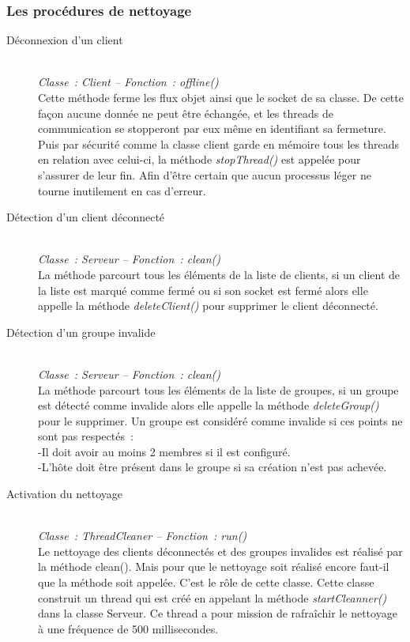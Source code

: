\documentclass[a4paper,11pt]{report}
\begin{document}
\subsubsection{Les procédures de nettoyage}
\begin{description}
  \item[Déconnexion d’un client]
  \textit{\\Classe : Client – Fonction : offline()\\}
Cette méthode ferme les flux objet ainsi que le socket de sa classe. De cette façon aucune donnée ne peut être échangée, et les threads de communication se stopperont par eux même en identifiant sa fermeture.
Puis par sécurité comme la classe client garde en mémoire tous les threads en relation avec celui-ci, la méthode \textit{stopThread()} est appelée pour s’assurer de leur fin. Afin d’être certain que aucun processus léger ne tourne inutilement en cas d’erreur.
  
  \item[Détection d’un client déconnecté]
  \textit{\\Classe : Serveur – Fonction : clean()\\}
  La méthode parcourt tous les éléments de la liste de clients, si un client de la liste est marqué comme fermé ou si son socket est fermé alors elle appelle la méthode \textit{deleteClient()} pour supprimer le client déconnecté.
  
  \item[Détection d’un groupe invalide]
  \textit{\\Classe : Serveur – Fonction : clean()\\}
  La méthode parcourt tous les éléments de la liste de groupes, si un groupe est détecté comme invalide alors elle appelle la méthode \textit{deleteGroup()} pour le supprimer.
Un groupe est considéré comme invalide si ces points ne sont pas respectés :\\
-Il doit avoir au moins 2 membres si il est configuré.\\
-L’hôte doit être présent dans le groupe si sa création n’est pas achevée.

  \item[Activation du nettoyage]
  \textit{\\Classe : ThreadCleaner – Fonction : run()\\}
  Le nettoyage des clients déconnectés et des groupes invalides est réalisé par la méthode clean(). Mais pour que le nettoyage soit réalisé encore faut-il que la méthode soit appelée. C’est le rôle de cette classe. Cette classe construit un thread qui est créé en appelant la méthode \textit{startCleanner()} dans la classe Serveur. Ce thread a pour mission de rafraîchir le nettoyage à une fréquence de 500 millisecondes.
  
  \end{description}
  
\end{document}

